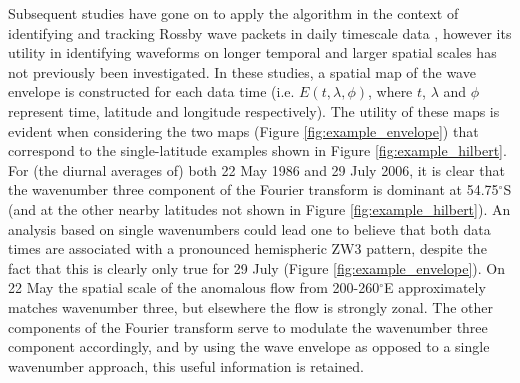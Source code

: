 Subsequent studies have gone on to apply the \citet{Zimin2003} algorithm in the context of identifying and tracking Rossby wave packets in daily timescale data \citep{Glatt2014,Souders2014a}, however its utility in identifying waveforms on longer temporal and larger spatial scales has not previously been investigated. In these studies, a spatial map of the wave envelope is constructed for each data time (i.e. $E(t,\lambda,\phi)$, where $t$, $\lambda$ and $\phi$ represent time, latitude and longitude respectively). The utility of these maps is evident when considering the two maps (Figure \ref{fig:example_envelope}) that correspond to the single-latitude examples shown in Figure \ref{fig:example_hilbert}. For (the diurnal averages of) both 22 May 1986 and 29 July 2006, it is clear that the wavenumber three component of the Fourier transform is dominant at 54.75$^{\circ}$S (and at the other nearby latitudes not shown in Figure \ref{fig:example_hilbert}). An analysis based on single wavenumbers could lead one to believe that both data times are associated with a pronounced hemispheric ZW3 pattern, despite the fact that this is clearly only true for 29 July (Figure \ref{fig:example_envelope}). On 22 May the spatial scale of the anomalous flow from 200-260$^{\circ}$E approximately matches wavenumber three, but elsewhere the flow is strongly zonal. The other components of the Fourier transform serve to modulate the wavenumber three component accordingly, and by using the wave envelope as opposed to a single wavenumber approach, this useful information is retained.
    